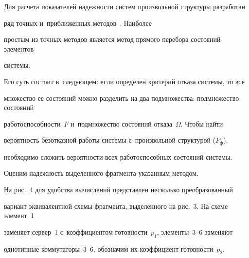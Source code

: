       Для расчета показателей надежности систем произвольной структуры разработан 

ряд точных и~приближенных методов~\cite{4-zac, 5-zac, 6-zac, 7-zac, 8-zac}. Наиболее 

простым из точных методов является метод прямого перебора состояний элементов 

системы. 

      

      Его суть состоит в~следующем: если определен критерий отказа системы, то все 

множество ее состояний можно разделить на два подмножества: подмножество состояний 

работоспособности~$F$ и~подмножество состояний отказа~$\Omega$. Чтобы найти 

вероятность безотказной работы системы с~произвольной структурой ($P_{\mathrm{ф}}$), 

необходимо сложить вероятности всех работоспособных состояний системы.

      

      Оценим надежность выделенного фрагмента указанным методом. 

      

      На рис.~4 для удобства вычислений представлен несколько преобразованный 

вариант эквивалентной схемы фрагмента, выделенного на рис.~3. На схеме элемент~1 

заменяет сервер~1 с~коэффициентом готовности~$p_1$, элементы~3--6 заменяют 

однотипные коммутаторы~3--6, обозначим их коэффициент готовности~$p_2$,\linebreak\vspace*{-12pt}



\pagebreak



\



\vspace*{-12pt}






